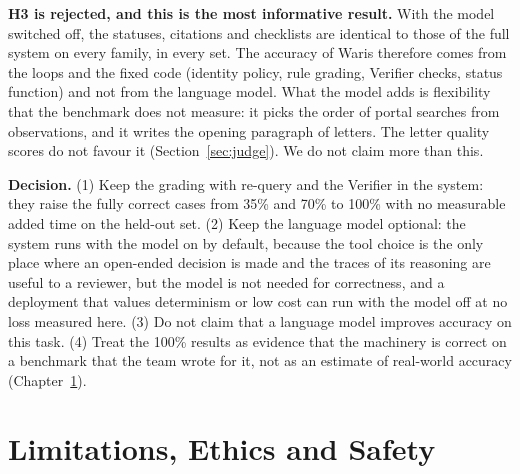 \documentclass[12pt,a4paper,oneside]{report}
\begin{document}
\textbf{H3 is rejected, and this is the most informative result.} With the model switched off, the statuses, citations and checklists are identical to those of the full system on every family, in every set. The accuracy of Waris therefore comes from the loops and the fixed code (identity policy, rule grading, Verifier checks, status function) and not from the language model. What the model adds is flexibility that the benchmark does not measure: it picks the order of portal searches from observations, and it writes the opening paragraph of letters. The letter quality scores do not favour it (Section~\ref{sec:judge}). We do not claim more than this.

\textbf{Decision.} (1) Keep the grading with re-query and the Verifier in the system: they raise the fully correct cases from 35\% and 70\% to 100\% with no measurable added time on the held-out set. (2) Keep the language model optional: the system runs with the model on by default, because the tool choice is the only place where an open-ended decision is made and the traces of its reasoning are useful to a reviewer, but the model is not needed for correctness, and a deployment that values determinism or low cost can run with the model off at no loss measured here. (3) Do not claim that a language model improves accuracy on this task. (4) Treat the 100\% results as evidence that the machinery is correct on a benchmark that the team wrote for it, not as an estimate of real-world accuracy (Chapter~\ref{ch:limits}).

\chapter{Limitations, Ethics and Safety}\label{ch:limits}
\end{document}
